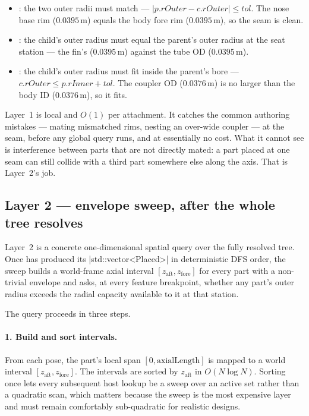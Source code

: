 \begin{itemize}
  \item {}: the two outer radii must match ---
        $\lvert p.\mathit{rOuter} - c.\mathit{rOuter}\rvert \le \mathit{tol}$. The nose base
        rim ($0.0395\,\mathrm{m}$) equals the body fore rim ($0.0395\,\mathrm{m}$), so the seam
        is clean. \ok
  \item {}: the child's outer radius must equal the parent's outer radius at the
        seat station --- the fin's  ($0.0395\,\mathrm{m}$) against the tube OD
        ($0.0395\,\mathrm{m}$). \ok
  \item {}: the child's outer radius must fit inside the parent's bore ---
        $c.\mathit{rOuter} \le p.\mathit{rInner} + \mathit{tol}$. The coupler OD
        ($0.0376\,\mathrm{m}$) is no larger than the body ID ($0.0376\,\mathrm{m}$), so it
        fits. \ok
\end{itemize}

Layer~1 is local and $O(1)$ per attachment. It catches the common authoring mistakes ---
mating mismatched rims, nesting an over-wide coupler --- at the seam, before any global query
runs, and at essentially no cost. What it cannot see is interference between parts that are not
directly mated: a part placed at one seam can still collide with a third part somewhere else
along the axis. That is Layer~2's job.

\subsection{Layer 2 --- envelope sweep, after the whole tree resolves}

\begin{designrule}
Layer~2 is a concrete one-dimensional spatial query over the fully resolved tree. Once
 has produced its \cppinline|std::vector<Placed>| in deterministic DFS
order, the sweep builds a world-frame axial interval $[z_{\mathrm{aft}}, z_{\mathrm{fore}}]$ for
every part with a non-trivial envelope and asks, at every feature breakpoint, whether any part's
outer radius exceeds the radial capacity available to it at that station.
\end{designrule}

The query proceeds in three steps.

\paragraph{1. Build and sort intervals.} From each  pose, the part's local span
$[0, \mathrm{axialLength}]$ is mapped to a world interval $[z_{\mathrm{aft}}, z_{\mathrm{fore}}]$.
The intervals are sorted by $z_{\mathrm{aft}}$ in $O(N\log N)$. Sorting once lets every
subsequent host lookup be a sweep over an active set rather than a quadratic scan, which matters
because the sweep is the most expensive layer and must remain comfortably sub-quadratic for
realistic designs.

